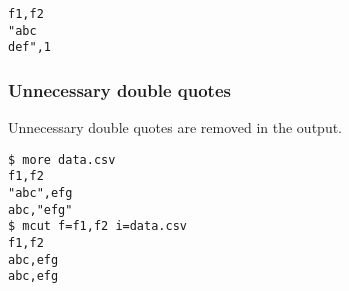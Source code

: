 \begin{Verbatim}[baselinestretch=0.7,frame=single]
f1,f2
"abc
def",1
\end{Verbatim}

\subsubsection{Unnecessary double quotes}
Unnecessary double quotes are removed in the output.

\begin{Verbatim}[baselinestretch=0.7,frame=single]
$ more data.csv
f1,f2
"abc",efg
abc,"efg"
$ mcut f=f1,f2 i=data.csv
f1,f2
abc,efg
abc,efg
\end{Verbatim}

%

